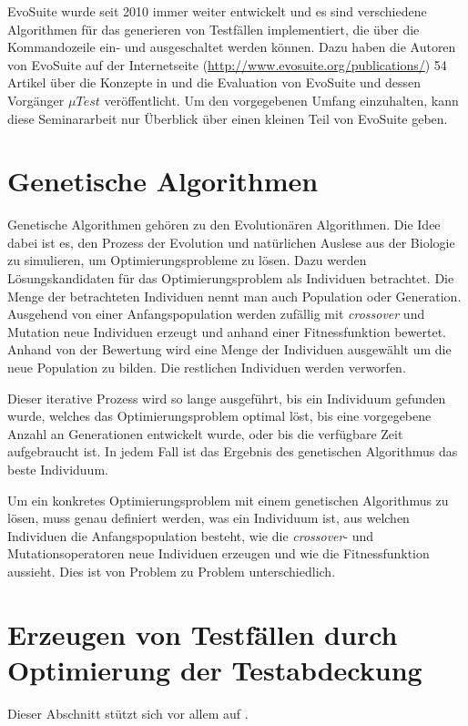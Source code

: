 \documentclass[a4paper,11pt]{article}
\begin{document}
EvoSuite wurde seit 2010 immer weiter entwickelt und es sind verschiedene Algorithmen für das generieren von Testfällen implementiert, die über die Kommandozeile ein- und ausgeschaltet werden können.
Dazu haben die Autoren von EvoSuite auf der Internetseite (\url{http://www.evosuite.org/publications/}) 54 Artikel über die Konzepte in und die Evaluation von EvoSuite und dessen Vorgänger ${\mu}Test$ veröffentlicht.
Um den vorgegebenen Umfang einzuhalten, kann diese Seminararbeit nur Überblick über einen kleinen Teil von EvoSuite geben.

\section{Genetische Algorithmen}

Genetische Algorithmen gehören zu den Evolutionären Algorithmen.
Die Idee dabei ist es, den Prozess der Evolution und natürlichen Auslese aus der Biologie zu simulieren, um Optimierungsprobleme zu lösen.
Dazu werden Lösungskandidaten für das Optimierungsproblem als Individuen betrachtet.
Die Menge der betrachteten Individuen nennt man auch Population oder Generation.
Ausgehend von einer Anfangspopulation werden zufällig mit \textit{crossover} und Mutation neue Individuen erzeugt und anhand einer Fitnessfunktion bewertet.
Anhand von der Bewertung wird eine Menge der Individuen ausgewählt um die neue Population zu bilden.
Die restlichen Individuen werden verworfen.

Dieser iterative Prozess wird so lange ausgeführt, bis ein Individuum gefunden wurde, welches das Optimierungsproblem optimal löst, bis eine vorgegebene Anzahl an Generationen entwickelt wurde, oder bis die verfügbare Zeit aufgebraucht ist.
In jedem Fall ist das Ergebnis des genetischen Algorithmus das beste Individuum.

Um ein konkretes Optimierungsproblem mit einem genetischen Algorithmus zu lösen, muss genau definiert werden, was ein Individuum ist, aus welchen Individuen die Anfangspopulation besteht, wie die \textit{crossover}- und Mutationsoperatoren neue Individuen erzeugen und wie die Fitnessfunktion aussieht.
Dies ist von Problem zu Problem unterschiedlich.

\section{Erzeugen von Testfällen durch Optimierung der Testabdeckung}

Dieser Abschnitt stützt sich vor allem auf \cite{TSE12_EvoSuite}.
\end{document}
